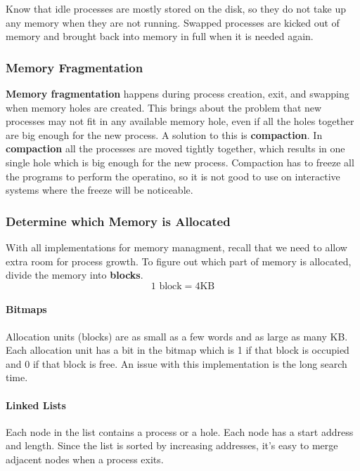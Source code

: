 \documentclass{article}
\newcommand{\bold}[1]{\textbf{#1}}
\begin{document}
Know that idle processes are mostly stored on the disk, so they do not take up any memory when they are not running. Swapped processes are kicked out of memory and brought back into memory in full when it is needed again. 

\subsubsection{Memory Fragmentation}

\bold{Memory fragmentation} happens during process creation, exit, and swapping when memory holes are created. This brings about the problem that new processes may not fit in any available memory hole, even if all the holes together are big enough for the new process. A solution to this is \bold{compaction}. In \bold{compaction} all the processes are moved tightly together, which results in one single hole which is big enough for the new process. Compaction has to freeze all the programs to perform the operatino, so it is not good to use on interactive systems where the freeze will be noticeable. \\ 

\subsubsection{Determine which Memory is Allocated}

With all implementations for memory managment, recall that we need to allow extra room for process growth. To figure out which part of memory is allocated, divide the memory into \bold{blocks}. $$\textrm{1 block} = 4 \textrm{KB}$$

\paragraph{Bitmaps}

Allocation units (blocks) are as small as a few words and as large as many KB. Each allocation unit has a bit in the bitmap which is 1 if that block is occupied and 0 if that block is free. An issue with this implementation is the long search time. 

\paragraph{Linked Lists}

Each node in the list contains a process or a hole. Each node has a start address and length. Since the list is sorted by increasing addresses, it's easy to merge adjacent nodes when a process exits. 
\end{document}
